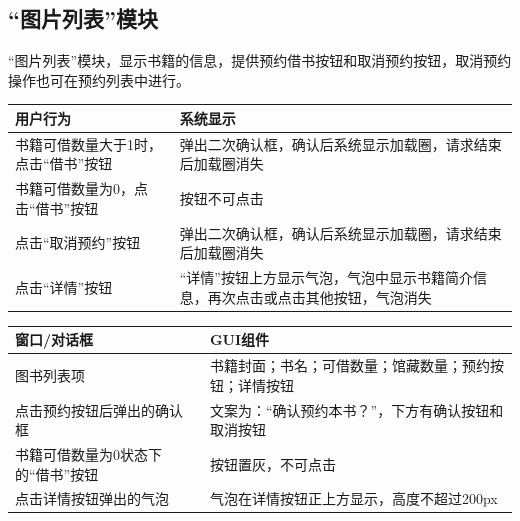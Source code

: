 \subsection{“图片列表”模块}
“图片列表”模块，显示书籍的信息，提供预约借书按钮和取消预约按钮，取消预约操作也可在预约列表中进行。
\begin{table}[ht]
    \centering
    \begin{tabular*}{\textwidth}{p{}p{}}
        \hline
        用户行为 & 系统显示\\
        \hline
        书籍可借数量大于1时，点击“借书”按钮 & 弹出二次确认框，确认后系统显示加载圈，请求结束后加载圈消失 \\
        书籍可借数量为0，点击“借书”按钮 & 按钮不可点击 \\
        点击“取消预约”按钮& 弹出二次确认框，确认后系统显示加载圈，请求结束后加载圈消失 \\
        点击“详情”按钮 & “详情”按钮上方显示气泡，气泡中显示书籍简介信息，再次点击或点击其他按钮，气泡消失 \\
        \hline
    \end{tabular*}
    \begin{tabular*}{\textwidth}{p{}p{}}
        \hline
        窗口/对话框  & GUI组件 \\
        \hline
        图书列表项 & 书籍封面；书名；可借数量；馆藏数量；预约按钮；详情按钮\\
        点击预约按钮后弹出的确认框 & 文案为：“确认预约本书？”，下方有确认按钮和取消按钮 \\
        书籍可借数量为0状态下的“借书”按钮 & 按钮置灰，不可点击\\
        点击详情按钮弹出的气泡 & 气泡在详情按钮正上方显示，高度不超过200px \\
        \hline
    \end{tabular*}
\end{table}
\newpage
